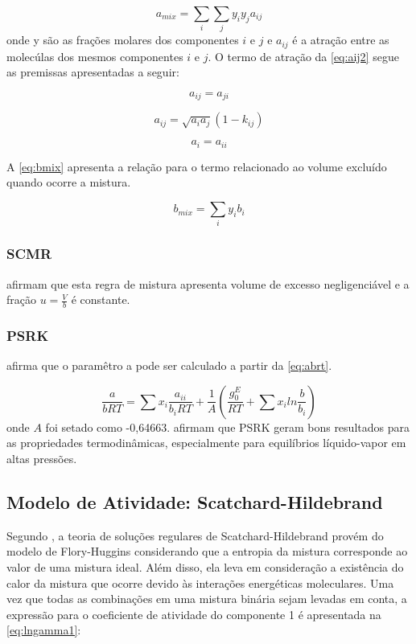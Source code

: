\begin{equation}\label{eq:aij}
a_{mix} = \sum_i\sum_jy_iy_ja_{ij}
\end{equation}
onde y são as frações molares dos componentes $i$ e $j$ e $a_{ij}$ é a
atração entre as molecúlas dos mesmos componentes $i$ e $j$. O termo de atração
da \autoref{eq:aij2} segue as premissas apresentadas a seguir:

\begin{equation}\label{eq:aij2}
a_{ij} = a_{ji}
\end{equation}

\begin{equation}\label{eq:aij3}
a_{ij} = \sqrt{a_ia_j}(1 - k_{ij})
\end{equation}

\begin{equation}\label{eq:aij4}
a_{i} = a_{ii}
\end{equation}

A \autoref{eq:bmix} apresenta a relação para o termo relacionado ao volume
excluído quando ocorre a mistura.

\begin{equation}\label{eq:bmix}
b_{mix} = \sum_iy_ib_i
\end{equation}

\subsubsection{SCMR}
 afirmam que esta regra de mistura
apresenta volume de excesso negligenciável e a fração $ u =
\frac{V}{b} $ é constante.

\subsubsection{PSRK}

 afirma que o paramêtro a pode ser calculado a partir
da \autoref{eq:abrt}.


\begin{equation}\label{eq:abrt}
\frac{a}{bRT} = \sum x_i\frac{a_{ii}}{b_iRT}+\frac{1}{A}\left (
\frac{g_0^E}{RT}+\sum x_iln\frac{b}{b_i} \right )
\end{equation}
onde $A$ foi setado como -0,64663.  afirmam
que PSRK geram bons resultados para as propriedades termodinâmicas, especialmente para 
equilíbrios líquido-vapor em altas pressões.

\subsection{Modelo de Atividade: Scatchard-Hildebrand}
Segundo , a teoria de soluções regulares de
Scatchard-Hildebrand provém do modelo de Flory-Huggins considerando que a entropia da mistura corresponde ao valor 
de uma mistura ideal. Além disso, ela leva em consideração a existência do 
calor da mistura que ocorre devido às interações energéticas moleculares. 
Uma vez que todas as combinações em uma mistura binária sejam levadas em 
conta, a expressão para o coeficiente de atividade do componente 1 é
apresentada na \autoref{eq:lngamma1}:

